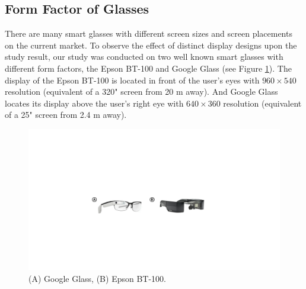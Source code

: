 \documentclass{sigchi}
\begin{document}
\subsection {Form Factor of Glasses}
  There are many smart glasses with different screen sizes and screen placements on the current market. To observe the effect of distinct display designs upon the study result, our study was conducted on two well known smart glasses with different form factors, the Epson BT-100 and Google Glass (see Figure \ref{fig:Glasses}). The display of the Epson BT-100 is located in front of the user's eyes with $960 \times 540$ resolution (equivalent of a 320" screen from 20 m away)\cite{BT100}. And Google Glass locates its display above the user's right eye with $640 \times 360$ resolution (equivalent of a 25" screen from 2.4 m away)\cite{GoogleGlass}.  

  \begin{figure}[!h]
  \centering
  \includegraphics[width=1\columnwidth]{Glasses.pdf}
  \caption{(A) Google Glass, (B) Epson BT-100.}
  \label{fig:Glasses}
  \end{figure}  
\end{document}
